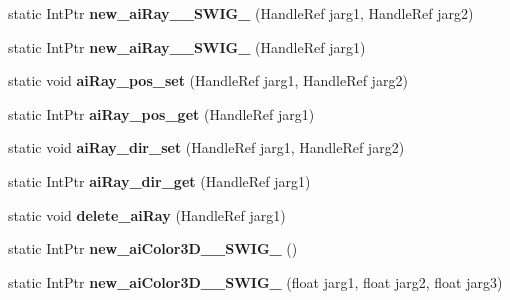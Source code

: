 \begin{DoxyCompactItemize}
\item 
\hypertarget{class_assimp_p_i_n_v_o_k_e_a62698200d86fbcfe3e8726d1b2e6ea89}{static Int\+Ptr {\bfseries new\+\_\+ai\+Ray\+\_\+\+\_\+\+S\+W\+I\+G\+\_} (Handle\+Ref jarg1, Handle\+Ref jarg2)}\label{class_assimp_p_i_n_v_o_k_e_a62698200d86fbcfe3e8726d1b2e6ea89}

\item 
\hypertarget{class_assimp_p_i_n_v_o_k_e_a6711dbafef18b965ccdad72ff792ef69}{static Int\+Ptr {\bfseries new\+\_\+ai\+Ray\+\_\+\+\_\+\+S\+W\+I\+G\+\_} (Handle\+Ref jarg1)}\label{class_assimp_p_i_n_v_o_k_e_a6711dbafef18b965ccdad72ff792ef69}

\item 
\hypertarget{class_assimp_p_i_n_v_o_k_e_ab7f8b6185162c495b500c1bd37e77c14}{static void {\bfseries ai\+Ray\+\_\+pos\+\_\+set} (Handle\+Ref jarg1, Handle\+Ref jarg2)}\label{class_assimp_p_i_n_v_o_k_e_ab7f8b6185162c495b500c1bd37e77c14}

\item 
\hypertarget{class_assimp_p_i_n_v_o_k_e_a33837a67b9e953f6ecd228e7a5abcb6c}{static Int\+Ptr {\bfseries ai\+Ray\+\_\+pos\+\_\+get} (Handle\+Ref jarg1)}\label{class_assimp_p_i_n_v_o_k_e_a33837a67b9e953f6ecd228e7a5abcb6c}

\item 
\hypertarget{class_assimp_p_i_n_v_o_k_e_a873be034713710bdf5fc24421f0b713d}{static void {\bfseries ai\+Ray\+\_\+dir\+\_\+set} (Handle\+Ref jarg1, Handle\+Ref jarg2)}\label{class_assimp_p_i_n_v_o_k_e_a873be034713710bdf5fc24421f0b713d}

\item 
\hypertarget{class_assimp_p_i_n_v_o_k_e_ad086017d13767e1f6e2c58e148d9556e}{static Int\+Ptr {\bfseries ai\+Ray\+\_\+dir\+\_\+get} (Handle\+Ref jarg1)}\label{class_assimp_p_i_n_v_o_k_e_ad086017d13767e1f6e2c58e148d9556e}

\item 
\hypertarget{class_assimp_p_i_n_v_o_k_e_ac5b489c20dde075b96c47fc8a5a1bc6d}{static void {\bfseries delete\+\_\+ai\+Ray} (Handle\+Ref jarg1)}\label{class_assimp_p_i_n_v_o_k_e_ac5b489c20dde075b96c47fc8a5a1bc6d}

\item 
\hypertarget{class_assimp_p_i_n_v_o_k_e_a668c81d28efadfbeeabd77413daa6927}{static Int\+Ptr {\bfseries new\+\_\+ai\+Color3\+D\+\_\+\+\_\+\+S\+W\+I\+G\+\_} ()}\label{class_assimp_p_i_n_v_o_k_e_a668c81d28efadfbeeabd77413daa6927}

\item 
\hypertarget{class_assimp_p_i_n_v_o_k_e_a698cea66d52a9115bbf9a7672e59eebf}{static Int\+Ptr {\bfseries new\+\_\+ai\+Color3\+D\+\_\+\+\_\+\+S\+W\+I\+G\+\_} (float jarg1, float jarg2, float jarg3)}\label{class_assimp_p_i_n_v_o_k_e_a698cea66d52a9115bbf9a7672e59eebf}


\end{DoxyCompactItemize}
